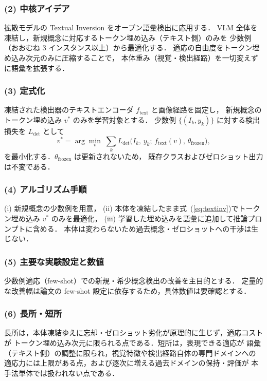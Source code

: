 \subsubsection*{(2) 中核アイデア}
拡散モデルの Textual Inversion をオープン語彙検出に応用する．
VLM 全体を凍結し，新規概念に対応するトークン埋め込み（テキスト側）のみを
少数例（おおむね 3 インスタンス以上）から最適化する．
適応の自由度をトークン埋め込み次元のみに圧縮することで，
本体重み（視覚・検出経路）を一切変えずに語彙を拡張する．

\subsubsection*{(3) 定式化}
凍結された検出器のテキストエンコーダ $f_{\mathrm{text}}$ と画像経路を固定し，
新規概念のトークン埋め込み $v^{\ast}$ のみを学習対象とする．
少数例 $\{(I_k, y_k)\}$ に対する検出損失を $L_{\mathrm{det}}$ として
\begin{equation}
v^{\ast} = \arg\min_{v}\; \sum_{k} L_{\mathrm{det}}\!\bigl(I_k,\, y_k;\, f_{\mathrm{text}}(v),\, \theta_{\mathrm{frozen}}\bigr),
\label{eq:textinv}
\end{equation}
を最小化する．$\theta_{\mathrm{frozen}}$ は更新されないため，
既存クラスおよびゼロショット出力は不変である．

\subsubsection*{(4) アルゴリズム手順}
(i) 新規概念の少数例を用意，
(ii) 本体を凍結したまま式~(\ref{eq:textinv})でトークン埋め込み $v^{\ast}$ のみを最適化，
(iii) 学習した埋め込みを語彙に追加して推論プロンプトに含める．
本体は変わらないため過去概念・ゼロショットへの干渉は生じない．

\subsubsection*{(5) 主要な実験設定と数値}
少数例適応（few-shot）での新規・希少概念検出の改善を主目的とする．
定量的な改善幅は論文の few-shot 設定に依存するため，具体数値は要確認とする．

\subsubsection*{(6) 長所・短所}
長所は，本体凍結ゆえに忘却・ゼロショット劣化が原理的に生じず，適応コストが
トークン埋め込み次元に限られる点である．短所は，表現できる適応が
語彙（テキスト側）の調整に限られ，視覚特徴や検出経路自体の専門ドメインへの
適応力には上限がある点，および逐次に増える過去ドメインの保持・評価が
本手法単体では扱われない点である．


